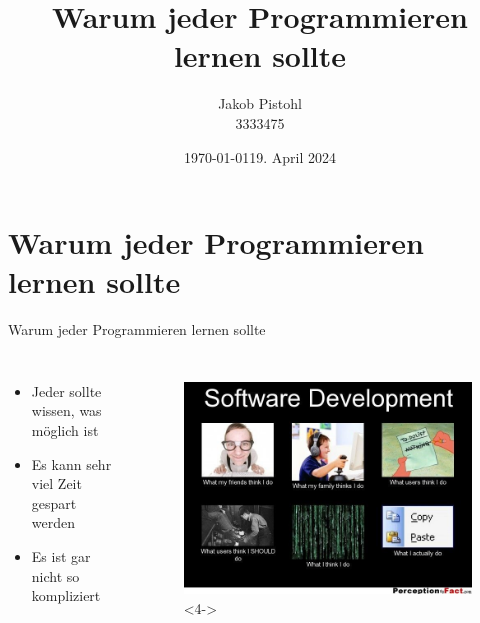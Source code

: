 \documentclass[a4paper,
	DIV=13,
	14pt,
	BCOR=10mm,
	department=FakEI,
	twoside,
	parskip=half,
	automark,
	aspectratio=169
]{beamer}
\date{\today}
\title{Warum jeder Programmieren lernen sollte}
\author{Jakob Pistohl \\ 3333475}
\date{19. April 2024}
\begin{document}
\maketitle

\section{Warum jeder Programmieren lernen sollte}
\begin{frame}{Warum jeder Programmieren lernen sollte}
	\begin{columns}
		\begin{itemize}
			\item<2-> Jeder sollte wissen, was möglich ist
			\item<3-> Es kann sehr viel Zeit gespart werden
			\item<4-> Es ist gar nicht so kompliziert
		\end{itemize}
		\begin{figure}[H]
			\includegraphics[width=\linewidth]{img/What-they-think.jpg}<4->
		\end{figure}
	\end{columns}
\end{frame}
\end{document}
